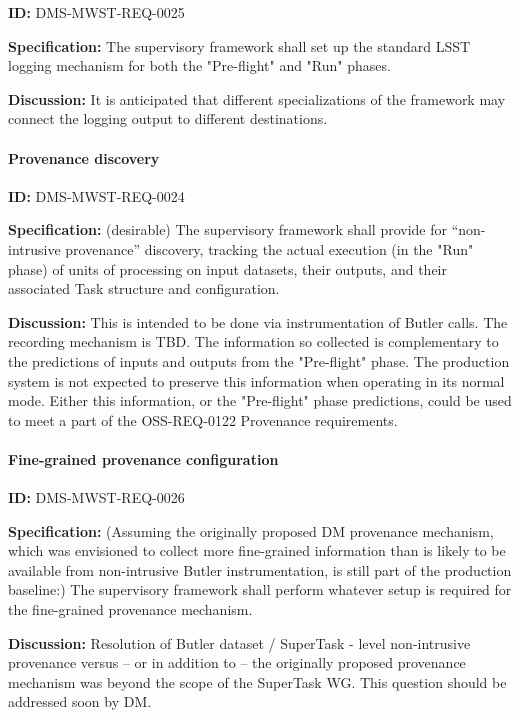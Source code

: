 \documentclass[SE,toc,lsstdraft]{lsstdoc}
\begin{document}
\label{DMS-MWST-REQ-0025}
\textbf{ID:} DMS-MWST-REQ-0025

\textbf{Specification:}
The supervisory framework shall set up the standard LSST logging mechanism for both the "Pre-flight" and "Run" phases.

\textbf{Discussion:}
It is anticipated that different specializations of the framework may connect the logging output to different destinations.

\paragraph{Provenance discovery}\hfill  %

\label{DMS-MWST-REQ-0024}
\textbf{ID:} DMS-MWST-REQ-0024

\textbf{Specification:}
(desirable) The supervisory framework shall provide for “non-intrusive provenance” discovery, tracking the actual execution (in the "Run" phase) of units of processing on input datasets, their outputs, and their associated Task structure and configuration.

\textbf{Discussion:}
This is intended to be done via instrumentation of Butler calls. The recording mechanism is TBD. The information so collected is complementary to the predictions of inputs and outputs from the "Pre-flight" phase. The production system is not expected to preserve this information when operating in its normal mode.  Either this information, or the "Pre-flight" phase predictions, could be used to meet a part of the OSS-REQ-0122 Provenance requirements.

\paragraph{Fine-grained provenance configuration}\hfill  %

\label{DMS-MWST-REQ-0026}
\textbf{ID:} DMS-MWST-REQ-0026

\textbf{Specification:}
(Assuming the originally proposed DM provenance mechanism, which was envisioned to collect more fine-grained information than is likely to be available from non-intrusive Butler instrumentation, is still part of the production baseline:) The supervisory framework shall perform whatever setup is required for the fine-grained provenance mechanism.

\textbf{Discussion:}
Resolution of Butler dataset / SuperTask - level non-intrusive provenance versus – or in addition to – the originally proposed provenance mechanism was beyond the scope of the SuperTask WG. This question should be addressed soon by DM.
\end{document}
